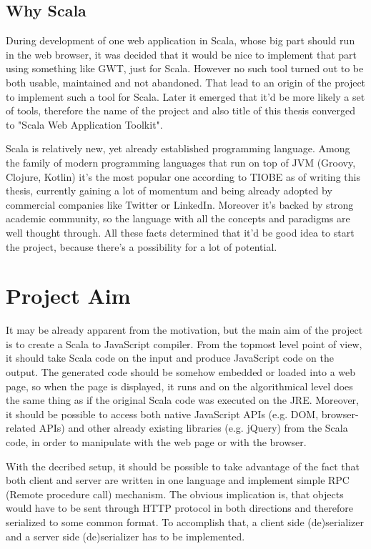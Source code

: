 \documentclass[12pt,a4paper]{report}
\begin{document}
\subsection{Why Scala}

During development of one web application in Scala, whose big part should run in the web browser, it was decided that it would be nice to implement that part using something like GWT, just for Scala. However no such tool turned out to be both usable, maintained and not abandoned. That lead to an origin of the project to implement such a tool for Scala. Later it emerged that it'd be more likely a set of tools, therefore the name of the project and also title of this thesis converged to "Scala Web Application Toolkit".

Scala is relatively new, yet already established programming language. Among the family of modern programming languages that run on top of JVM (Groovy, Clojure, Kotlin) it's the most popular one according to TIOBE as of writing this thesis, currently gaining a lot of momentum and being already adopted by commercial companies like Twitter or LinkedIn. Moreover it's backed by strong academic community, so the language with all the concepts and paradigms are well thought through. All these facts determined that it'd be good idea to start the project, because there's a possibility for a lot of potential.

\section{Project Aim}

It may be already apparent from the motivation, but the main aim of the project is to create a Scala to JavaScript compiler. From the topmost level point of view, it should take Scala code on the input and produce JavaScript code on the output. The generated code should be somehow embedded or loaded into a web page, so when the page is displayed, it runs and on the algorithmical level does the same thing as if the original Scala code was executed on the JRE. Moreover, it should be possible to access both native JavaScript APIs (e.g. DOM, browser-related APIs) and other already existing libraries (e.g. jQuery) from the Scala code, in order to manipulate with the web page or with the browser.

With the decribed setup, it should be possible to take advantage of the fact that both client and server are written in one language and implement simple RPC (Remote procedure call\cite{rpc}) mechanism. The obvious implication is, that objects would have to be sent through HTTP protocol in both directions and therefore serialized to some common format. To accomplish that, a client side (de)serializer and a server side (de)serializer has to be implemented.
\end{document}
